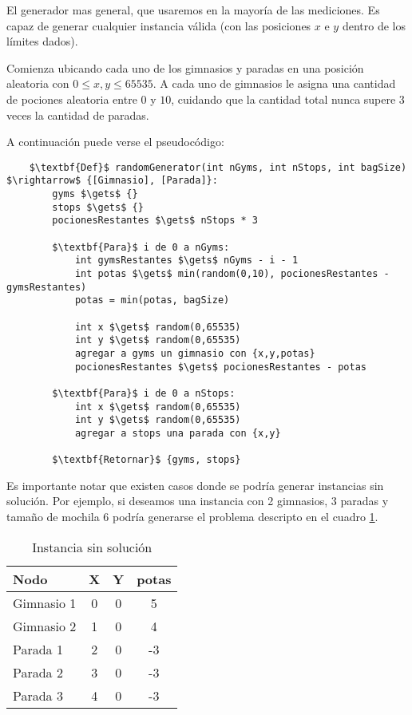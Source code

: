 El generador mas general, que usaremos en la mayoría de las mediciones.
Es capaz de generar cualquier instancia válida
(con las posiciones $x$ e $y$ dentro de los límites dados).

Comienza ubicando cada uno de los gimnasios y paradas en una posición aleatoria con $0 \leq x,y \leq 65535$.
A cada uno de gimnasios le asigna una cantidad de pociones aleatoria entre $0$ y $10$, cuidando que la cantidad total nunca supere 3 veces la cantidad de paradas.

A continuación puede verse el pseudocódigo:

\begin{lstlisting}
    $\textbf{Def}$ randomGenerator(int nGyms, int nStops, int bagSize) $\rightarrow$ {[Gimnasio], [Parada]}:
        gyms $\gets$ {}
        stops $\gets$ {}
        pocionesRestantes $\gets$ nStops * 3

        $\textbf{Para}$ i de 0 a nGyms:
            int gymsRestantes $\gets$ nGyms - i - 1
            int potas $\gets$ min(random(0,10), pocionesRestantes - gymsRestantes)
            potas = min(potas, bagSize)

            int x $\gets$ random(0,65535)
            int y $\gets$ random(0,65535)
            agregar a gyms un gimnasio con {x,y,potas}
            pocionesRestantes $\gets$ pocionesRestantes - potas

        $\textbf{Para}$ i de 0 a nStops:
            int x $\gets$ random(0,65535)
            int y $\gets$ random(0,65535)
            agregar a stops una parada con {x,y}

        $\textbf{Retornar}$ {gyms, stops}
\end{lstlisting}

Es importante notar que existen casos donde se podría generar instancias sin solución.
Por ejemplo, si deseamos una instancia con 2 gimnasios, 3 paradas y tamaño de mochila 6
podría generarse el problema descripto en el cuadro \ref{tab:generadores-random-sinsolu}.

\begin{table}[H]
    \begin{center}
        \begin{tabular}{l | c c c}
            Nodo   & X & Y & potas \\
            \hline
            Gimnasio 1 & 0 & 0 &  5 \\
            Gimnasio 2 & 1 & 0 &  4 \\
            Parada 1   & 2 & 0 & -3 \\
            Parada 2   & 3 & 0 & -3 \\
            Parada 3   & 4 & 0 & -3 \\
        \end{tabular}
        \caption{Instancia sin solución}\label{tab:generadores-random-sinsolu}
    \end{center}
\end{table}

